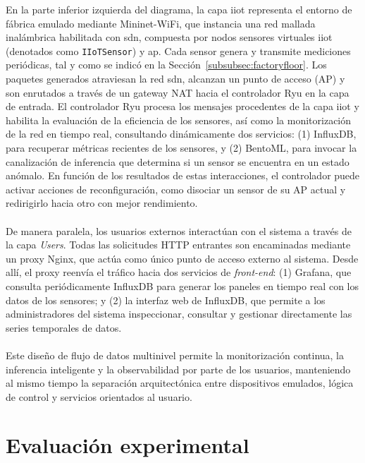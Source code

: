 En la parte inferior izquierda del diagrama, la capa \gls{iiot} representa el entorno de fábrica emulado mediante Mininet-WiFi, que instancia una red mallada inalámbrica habilitada con \gls{sdn}, compuesta por nodos sensores virtuales \gls{iiot} (denotados como \texttt{IIoTSensor}) y \gls{ap}. Cada sensor genera y transmite mediciones periódicas, tal y como se indicó en la Sección~\ref{subsubsec:factoryfloor}. Los paquetes generados atraviesan la red \gls{sdn}, alcanzan un punto de acceso (AP) y son enrutados a través de un gateway NAT hacia el controlador Ryu en la capa de entrada. El controlador Ryu procesa los mensajes procedentes de la capa \gls{iiot} y habilita la evaluación de la eficiencia de los sensores, así como la monitorización de la red en tiempo real, consultando dinámicamente dos servicios: (1) InfluxDB, para recuperar métricas recientes de los sensores, y (2) BentoML, para invocar la canalización de inferencia que determina si un sensor se encuentra en un estado anómalo. En función de los resultados de estas interacciones, el controlador puede activar acciones de reconfiguración, como disociar un sensor de su AP actual y redirigirlo hacia otro con mejor rendimiento.\\
\\
De manera paralela, los usuarios externos interactúan con el sistema a través de la capa \textit{Users}. Todas las solicitudes HTTP entrantes son encaminadas mediante un proxy Nginx, que actúa como único punto de acceso externo al sistema. Desde allí, el proxy reenvía el tráfico hacia dos servicios de \textit{front-end}: (1) Grafana, que consulta periódicamente InfluxDB para generar los paneles en tiempo real con los datos de los sensores; y (2) la interfaz web de InfluxDB, que permite a los administradores del sistema inspeccionar, consultar y gestionar directamente las series temporales de datos.\\
\\
Este diseño de flujo de datos multinivel permite la monitorización continua, la inferencia inteligente y la observabilidad por parte de los usuarios, manteniendo al mismo tiempo la separación arquitectónica entre dispositivos emulados, lógica de control y servicios orientados al usuario.


\section{Evaluación experimental}
\label{sec:eva}

